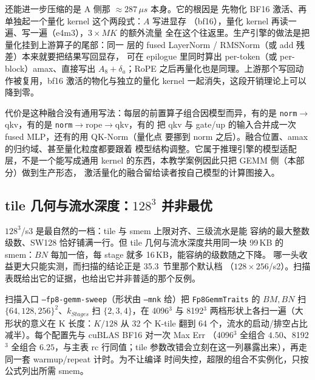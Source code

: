 还能进一步压缩的是 A 侧那 $\approx 287\,\mu s$ 本身。它的根因是
先物化 BF16 激活、再单独起一个量化 kernel 这个两段式：$A$ 写进显存
（bf16），量化 kernel 再读一遍、写一遍（e4m3），$3\times MK$ 的额外流量
全在这个往返里。生产引擎的做法是把量化挂到上游算子的尾部：同一
层的 fused LayerNorm / RMSNorm（或 add 残差）本来就要把结果写回显存，
可在 epilogue 里同时算出 per-token（或 per-block）amax、直接写出
$A_8+\delta_a$；RoPE 之后再量化也是同理。上游那个写回动作被复用，bf16
激活的物化与独立的量化 kernel 一起消失，这段开销理论上可以降到零。

代价是这种融合没有通用写法：每层的前置算子组合因模型而异，有的是
\texttt{norm}$\to$qkv，有的是 \texttt{norm}$\to$rope$\to$qkv，有的
把 qkv 与 gate/up 的输入合并成一次 fused MLP，还有的用 QK-Norm（量化点
要挪到 norm 之后）。融合位置、amax 的归约域、甚至量化粒度都要跟着
模型结构调整。它属于推理引擎的模型适配层，不是一个能写成通用
kernel 的东西，本教学案例因此只把 GEMM 侧（本部分）做到生产形态，
激活量化的融合留给读者按自己模型的计算图接入。

\subsection{tile 几何与流水深度：$128^3$ 并非最优}\label{sec:35-sweep}

$128^3$/s3 是最自然的一档：tile 与 smem 上限对齐、三级流水是能
容纳的最大整数级数、SW128 恰好铺满一行。但 tile 几何与流水深度共用同一块
99\,KB 的 smem：$BN$ 每加一倍，每 stage 就多 16\,KB，能容纳的级数随之下降。
哪一头收益更大只能实测，而扫描的结论正是 35.3~节里那个默认档
（$128\times256$/s2）。扫描表既给出它的证据，也给出它并非普适的那个反例。

扫描入口 \texttt{--fp8-gemm-sweep}（形状由
\texttt{--mnk} 给）把 \texttt{Fp8GemmTraits} 的 $BM,BN$ 扫
$\{64,128,256\}^2$、$k_{Stages}$ 扫 $\{2,3,4\}$，在 4096$^3$ 与 8192$^3$
两档形状上各扫一遍（大形状的意义在 K 长度：$K/128$ 从 32 个 K-tile 翻到
64 个，流水的启动/排空占比减半）。每个配置先与 cuBLAS BF16 对一次 Max Err
（4096$^3$ 全组合 $4.50$、8192$^3$ 全组合 $6.25$，与主表 rc 行同值；tile
参数改错会立刻在这一列暴露出来），再走同一套 warmup/repeat 计时。为不让编译
时间失控，超限的组合不实例化，只按公式列出所需 smem。

